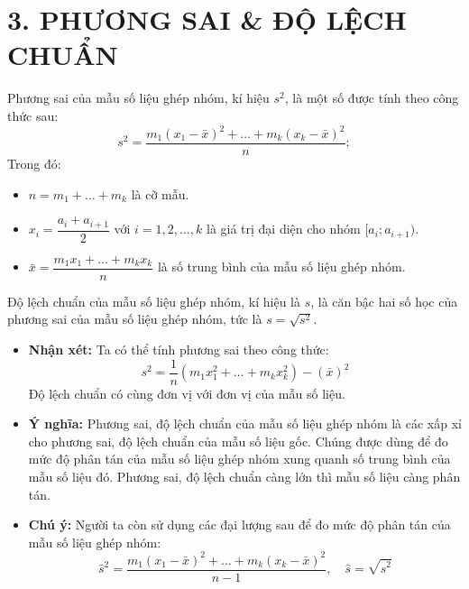 \documentclass[12pt,a4paper]{extarticle}
\begin{document}
\section*{\color{blue!80!black}3. PHƯƠNG SAI \& ĐỘ LỆCH CHUẨN}
\begin{tcolorbox}[
    colback=blue!5!white,
    colframe=blue!75!black,
    sharp corners,
    boxrule=0pt,
    leftrule=3pt,
    top=8pt,
    bottom=8pt,
    left=12pt
]
    Phương sai của mẫu số liệu ghép nhóm, kí hiệu $s^2$, là một số được tính theo công thức sau:
    \[
    s^2 = \frac{m_1(x_1 - \bar{x})^2 + \dots + m_k(x_k - \bar{x})^2}{n};
    \]
    Trong đó:
    \begin{itemize}[leftmargin=*, label=$\bullet$, itemsep=0.4em]
        \item $n = m_1 + \dots + m_k$ là cỡ mẫu.
        \item $x_i = \dfrac{a_i + a_{i+1}}{2}$ với $i = 1, 2, \dots, k$ là giá trị đại diện cho nhóm $[a_i; a_{i+1})$.
        \item $\bar{x} = \dfrac{m_1 x_1 + \dots + m_k x_k}{n}$ là số trung bình của mẫu số liệu ghép nhóm.
    \end{itemize}
\end{tcolorbox}
\vspace{1.5em}
\begin{tcolorbox}[
    colback=blue!5!white,
    colframe=blue!75!black,
    sharp corners,
    boxrule=0pt,
    leftrule=3pt,
    top=8pt,
    bottom=8pt,
    left=12pt
]
    Độ lệch chuẩn của mẫu số liệu ghép nhóm, kí hiệu là $s$, là căn bậc hai số học của phương sai của mẫu số liệu ghép nhóm, tức là \textbf{\color{blue!80!black}$s = \sqrt{s^2}$}.
\end{tcolorbox}
\vspace{1.5em}
\begin{itemize}[leftmargin=*, label={\color{blue!80!black}$\blacktriangleright$}, itemsep=1em]
    \item \textbf{Nhận xét:} Ta có thể tính phương sai theo công thức:
    \[
    s^2 = \frac{1}{n}\left(m_1 x_1^2 + \dots + m_k x_k^2\right) - (\bar{x})^2
    \]
    Độ lệch chuẩn có cùng đơn vị với đơn vị của mẫu số liệu.
    \item \textbf{Ý nghĩa:} Phương sai, độ lệch chuẩn của mẫu số liệu ghép nhóm là các xấp xỉ cho phương sai, độ lệch chuẩn của mẫu số liệu gốc. Chúng được dùng để đo mức độ phân tán của mẫu số liệu ghép nhóm xung quanh số trung bình của mẫu số liệu đó. Phương sai, độ lệch chuẩn càng lớn thì mẫu số liệu càng phân tán.
    \item \textbf{Chú ý:} Người ta còn sử dụng các đại lượng sau để đo mức độ phân tán của mẫu số liệu ghép nhóm:
    \[
    \hat{s}^2 = \frac{m_1(x_1 - \bar{x})^2 + \dots + m_k(x_k - \bar{x})^2}{n-1}, \quad \hat{s} = \sqrt{\hat{s}^2}
    \]
\end{itemize}
\end{document}

